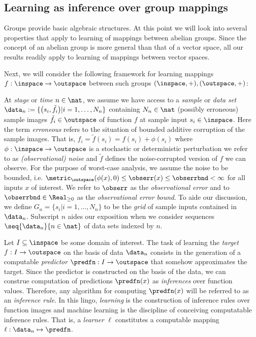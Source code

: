\subsection{Learning as inference over group mappings}
\label{sec:group_learners}
Groups provide basic algebraic structures. At this point we will look into several properties that apply to learning of mappings between abelian groups. Since the concept of an abelian group is more general than that of a vector space, all our results readily apply to learning of mappings between vector spaces.


Next, we will consider the following framework for learning mappings $f:\inspace \to \outspace$ between such groups $(\inspace,+), (\outspace,+)$: 

At \emph{stage} or \emph{time} $n \in \nat$, we assume we have access to a \textit{sample} or \textit{data set} $\data_n:= \{\bigl( s_i, \tilde f_i\bigr) \vert i=1,\ldots, N_n \} $ containing $N_n \in \nat$ (possibly erroneous) sample images $\tilde f_i \in \outspace$ of function $f$ at sample input $s_i \in \inspace$. Here the term \emph{erroneous} refers to the situation of bounded additive corruption of the sample images. That is,  $f_i = \tilde f(s_i) = f(s_i) + \phi(s_i)$ where $\phi: \inspace \to \outspace$ is a stochastic or deterministic perturbation we refer to as \emph{(observational) noise} and $\tilde f$ defines the noise-corrupted version of $f$ we can observe. For the purpose of worst-case analysis, we assume the noise to be bounded, i.e. $\metric_\outspace(\phi(x),0) \leq \obserr(x) \leq \obserrbnd <\infty$ for all inputs $x$ of interest.
We refer to $\obserr$ as the \emph{ observational error} and to $\obserrbnd \in \Real_{\geq 0}$ as the \emph{observational error bound}.
To aide our discussion, we define $G_n =\{s_i | i =1,\ldots,N_n\}$ to be the \textit{grid} of sample inputs contained in $\data_n$. Subscript $n$ aides our exposition when we consider sequences $\seq{\data_n}{n \in \nat}$ of data sets indexed by $n$.

Let $I \subseteq \inspace$ be some domain of interest.
The task of learning the \emph{target} $f: I  \to \outspace$ on the basis of data $\data_n$ consists in the generation of a computable \emph{predictor} $\predfn: I \to \outspace$ that somehow approximates the target. Since the predictor is constructed on the basis of the data, we can construe computation of predictions $\predfn(x)$ as \emph{inferences} over function values. Therefore, any algorithm for computing $\predfn(x)$ will be referred to as an \emph{inference rule}. In this lingo, \emph{learning} is the construction of inference rules over function images and machine learning is the discipline of conceiving computatable inference rules.  
That is, a \emph{learner} $\ell$ constitutes a computable mapping $\ell: \data_n \mapsto \predfn$.

